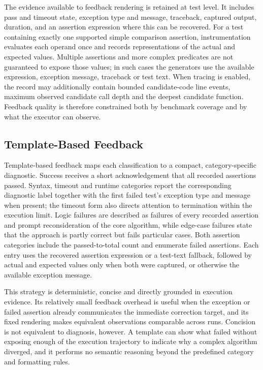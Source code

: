 The evidence available to feedback rendering is retained at test level. It includes pass and timeout state, exception type and message, traceback, captured output, duration, and an assertion expression where this can be recovered. For a test containing exactly one supported simple comparison assertion, instrumentation evaluates each operand once and records representations of the actual and expected values. Multiple assertions and more complex predicates are not guaranteed to expose those values; in such cases the generators use the available expression, exception message, traceback or test text. When tracing is enabled, the record may additionally contain bounded candidate-code line events, maximum observed candidate call depth and the deepest candidate function. Feedback quality is therefore constrained both by benchmark coverage and by what the executor can observe.

\subsection{Template-Based Feedback}

Template-based feedback maps each classification to a compact, category-specific diagnostic. Success receives a short acknowledgement that all recorded assertions passed. Syntax, timeout and runtime categories report the corresponding diagnostic label together with the first failed test's exception type and message when present; the timeout form also directs attention to termination within the execution limit. Logic failures are described as failures of every recorded assertion and prompt reconsideration of the core algorithm, while edge-case failures state that the approach is partly correct but fails particular cases. Both assertion categories include the passed-to-total count and enumerate failed assertions. Each entry uses the recovered assertion expression or a test-text fallback, followed by actual and expected values only when both were captured, or otherwise the available exception message.

This strategy is deterministic, concise and directly grounded in execution evidence. Its relatively small feedback overhead is useful when the exception or failed assertion already communicates the immediate correction target, and its fixed rendering makes equivalent observations comparable across runs. Concision is not equivalent to diagnosis, however. A template can show what failed without exposing enough of the execution trajectory to indicate why a complex algorithm diverged, and it performs no semantic reasoning beyond the predefined category and formatting rules.

